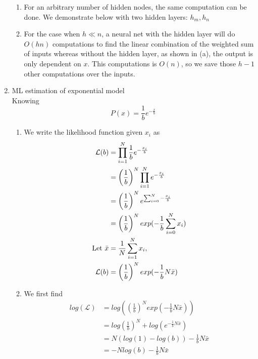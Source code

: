 \documentclass{article}
\begin{document}
\begin{enumerate}
\begin{enumerate}
            \item %
                For an arbitrary number of hidden nodes, the same
                computation can be done. We demonstrate below with two
                hidden layers: \(h_m, h_n\)
            \item %
                For the case when \(h \ll n\), a neural net with the hidden
                layer will do \(O(hn)\) computations to find the linear
                combination of the weighted sum of inputs whereas without
                the hidden layer, as shown in (a), the output is only
                dependent on \(x\). This computations is \(O(n)\), so we 
                save those \(h-1\) other computations over the inputs.
        \end{enumerate}
    \item ML estimation of exponential model \\ %
        Knowing
        \begin{equation*}
            P(x) = \frac{1}{b}e^{-\frac{x}{b}}
        \end{equation*}
        \begin{enumerate}
            \item %
                We write the likelihood function given \(x_i\) as
                \begin{align*}
                \mathcal{L}(b) 
                &= \prod_{i = 1}^N \frac{1}{b}e^{-\frac{x_i}{b}}\\
                &= \left(\frac{1}{b}\right)^N \prod_{i=1}^N e^{-\frac{x_i}{b}}\\
                &= \left(\frac{1}{b}\right)^N e^{\sum_{i=0}^N -\frac{x_i}{b}}\\
                &= \left(\frac{1}{b}\right)^N exp(-\frac{1}{b}\sum_{i=0}^N x_i)\\
                \textnormal{Let } \bar{x} &= \frac{1}{N}\sum_{i=1}^Nx_i,\\
                \mathcal{L}(b) &= \left(\frac{1}{b}\right)^N exp(-\frac{1}{b}N\bar{x})
                \end{align*}

            \item %
                We first find
                \begin{align*}
                log(\mathcal{L}) 
                    &= log\left(\left(\frac{1}{b}\right)^N exp(-\frac{1}{b}N\bar{x})\right)\\
                    &= log\left(\frac{1}{b}\right)^N + 
                        log\left(e^{-\frac{1}{b}N\bar{x}}\right)\\
                    &= N(log(1) - log(b)) -\frac{1}{b}N\bar{x}\\
                    &= -Nlog(b) - \frac{1}{b}N\bar{x}
                \end{align*}


\end{enumerate}
\end{enumerate}
\end{document}
